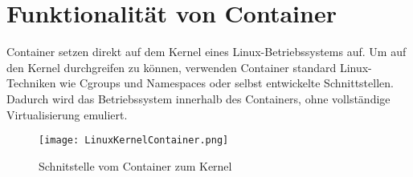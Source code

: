 \section{Funktionalität von Container}
\label{sec:Funktionalität von Container}

Container setzen direkt auf dem Kernel eines Linux-Betriebssystems auf. Um auf den Kernel durchgreifen zu können, verwenden Container standard Linux-Techniken wie Cgroups und Namespaces oder selbst entwickelte Schnittstellen. Dadurch wird das Betriebssystem innerhalb des Containers, ohne vollständige Virtualisierung emuliert.
\begin{figure}[H]
	\begin{center}
		\texttt{[image: LinuxKernelContainer.png]}
	\end{center}
	\caption[Schnitstelle vom Container zum Kernel]{Schnitstelle vom Container zum Kernel \footnotemark}
	\label{fig:Schnittstelle}
\end{figure}

